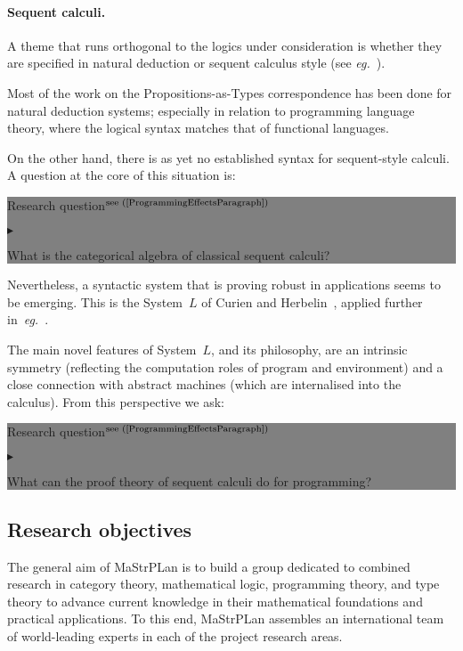 \documentclass[11pt,twocolumn]{article}
\newenvironment{btritemize}
  {\begin{list}{\btr}
  {\setlength{\topsep}{2pt}
   \setlength{\partopsep}{2pt}
   \setlength{\itemsep}{2.5pt}
   \setlength{\parsep}{2.5pt}
   \setlength{\leftmargin}{1em}
   \setlength{\labelwidth}{.5em}}}
  {\end{list}}
\newcommand{\mytextsf}[1]{\textsf{\small #1}}
\newcommand{\erc}{{\small\sf MaStrPLan}}
\newcommand{\eg}{\emph{eg.}}
\newcommand{\SystemL}{\mbox{System~$L$}}
\newcommand{\btr}{$\blacktriangleright$}
\newcommand{\reqpsize}{8.113395cm}%
\newcommand{\req}[2]{\begin{center}\colorbox{grey}{\begin{minipage}{\reqpsize} 
  \mytextsf{Research question}\hfill$^{\mbox{\scriptsize see #1 }}$\\[-5.5mm]
  \begin{btritemize}
  \item #2
  \end{btritemize}
\end{minipage}}\end{center}}
\begin{document}
\paragraph{Sequent calculi.}
\label{SequentCalculiParagraph}

A theme that runs orthogonal to the logics under consideration is whether
they are specified in natural deduction or sequent calculus
style (see \eg~\cite{vonPlato}).

Most of the work on the Propositions-as-Types correspondence has been done
for natural deduction systems; especially in relation to programming
language theory, where the logical syntax matches that of functional
languages.  

On the other hand, there is as yet no established syntax for sequent-style
calculi.  A question at the core of this situation is:
%
\req{(\ref{ProgrammingEffectsParagraph})}
  {What is the categorical algebra of classical sequent calculi?}
%
Nevertheless, a syntactic system that is proving robust in applications
seems to be emerging.  This is the {\SystemL} of Curien and
Herbelin~\cite{CurienHerbelin}, applied further
in~\eg~\cite{Wadler,Munch,CurienMunch}.

The main novel features of {\SystemL}, and its philosophy, are an
intrinsic symmetry (reflecting the computation roles of program and
environment) and a close connection with abstract machines (which are
internalised into the calculus).  From this perspective we ask:
%
\req{(\ref{ProgrammingEffectsParagraph})}
  {What can the proof theory of sequent calculi do for programming?}

\subsection{Research objectives}
\label{ObjectivesSubsection}

The general aim of {\erc} is to build a group dedicated to combined
research in category theory, mathematical logic, programming theory, and
type theory to advance current knowledge in their mathematical foundations
and practical applications.  To this end, {\erc} assembles an
international team of world-leading experts in each of the project
research areas.  
\end{document}
